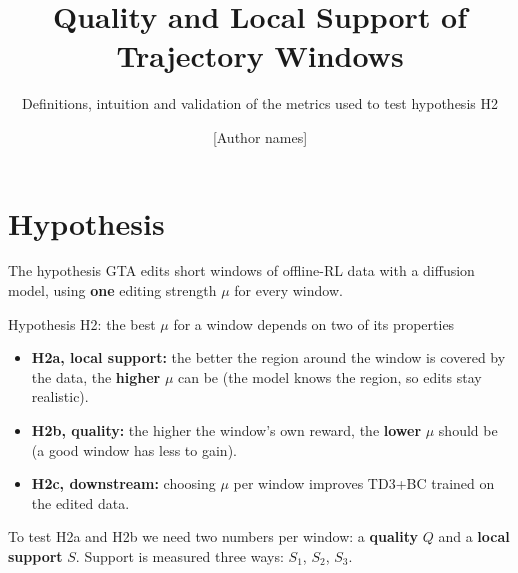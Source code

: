 \documentclass[aspectratio=169,11pt]{beamer}
\title{Quality and Local Support of Trajectory Windows}
\subtitle{Definitions, intuition and validation of the metrics used to test hypothesis H2}
\author{[Author names]}
\date{}
\begin{document}
\begin{frame}
\titlepage
\end{frame}

\section{Hypothesis}
\begin{frame}{The hypothesis}
GTA edits short windows of offline-RL data with a diffusion model, using \textbf{one} editing strength $\mu$ for every window.
\vspace{0.5em}
\begin{block}{Hypothesis H2: the best $\mu$ for a window depends on two of its properties}
\begin{itemize}
\item \textbf{H2a, local support:} the better the region around the window is covered by the data, the \textbf{higher} $\mu$ can be (the model knows the region, so edits stay realistic).
\item \textbf{H2b, quality:} the higher the window's own reward, the \textbf{lower} $\mu$ should be (a good window has less to gain).
\item \textbf{H2c, downstream:} choosing $\mu$ per window improves TD3+BC trained on the edited data.
\end{itemize}
\end{block}
\vspace{0.5em}
To test H2a and H2b we need two numbers per window: a \textbf{quality} $Q$ and a \textbf{local support} $S$. Support is measured three ways: $S_1$, $S_2$, $S_3$.
\end{frame}

\end{document}
